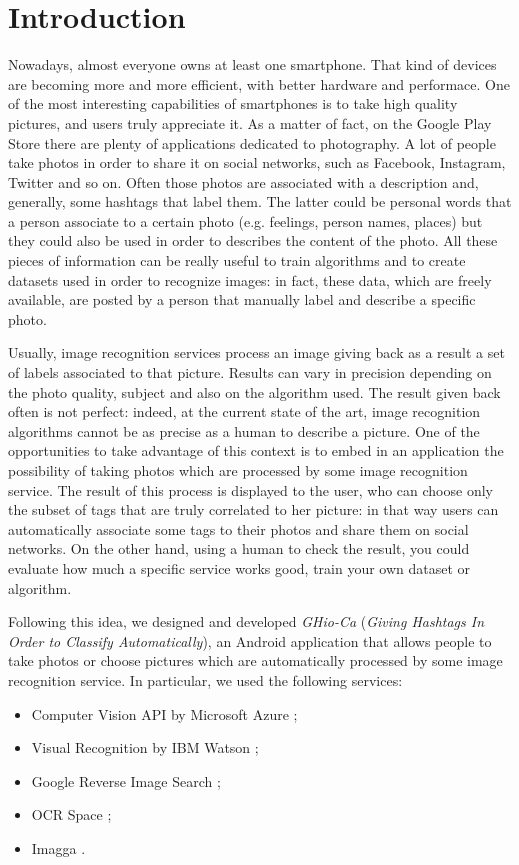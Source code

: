 \section{Introduction}
\label{sec:introduction}

Nowadays, almost everyone owns at least one smartphone. That kind of devices are 
becoming more and more efficient, with better hardware and performace. One of the 
most interesting capabilities of smartphones is to take high quality pictures, and 
users truly appreciate it. As a matter of fact, on the Google Play Store there 
are plenty of applications dedicated to photography.
A lot of people take photos in order to share it on social networks, such as 
Facebook, Instagram, Twitter and so on. Often those photos are associated with a 
description and, generally, some hashtags that label them. The latter could be 
personal words that a person associate to a certain photo (e.g. feelings, person 
names, places) but they could also be used in order to describes the content of 
the photo.
All these pieces of information can be really useful to train algorithms and to 
create datasets used in order to recognize images: in fact, these data, which 
are freely available, are posted by a person that manually label and describe a 
specific photo.

Usually, image recognition services process an image giving back as a result 
a set of labels associated to that picture. Results can vary in precision 
depending on the photo quality, subject and also on the algorithm used. 
The result given back often is not perfect: indeed, at the current state of the art, image 
recognition algorithms cannot be as precise as a human to describe a picture.
One of the opportunities to take advantage of this context is to embed in an application 
the possibility of taking photos which are processed by some image 
recognition service. The result of this process is displayed to the user, 
who can choose only the subset of tags that are truly correlated to her 
picture: in that way users can automatically associate some tags to their photos 
and share them on social networks. On the other hand, using a human to check the 
result, you could evaluate how much a specific service works good, train your own 
dataset or algorithm.

Following this idea, we designed and developed \textit{GHio-Ca} (\textit{Giving 
Hashtags In Order to Classify Automatically}), an Android application that 
allows people to take photos or choose pictures which are automatically 
processed by some image recognition service. In particular, we used the 
following services:
\begin{itemize}
  \item Computer Vision API by Microsoft Azure \cite{Microsoft};
  \item Visual Recognition by IBM Watson \cite{IBM};
  \item Google Reverse Image Search \cite{Google};
  \item OCR Space \cite{OCR};
  \item Imagga \cite{Imagga}.
\end{itemize}

